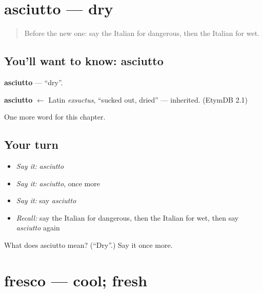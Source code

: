 \section[asciutto]{asciutto — dry}

\label{lesson:IT-C128-asciutto}



\begin{quote}
Before the new one: say the Italian for dangerous, then the Italian for wet.
\end{quote}

\subsection*{You'll want to know: asciutto}
\textbf{asciutto} — \textquotedblleft{}dry\textquotedblright{}.

\begin{cousinweb}
\textbf{asciutto} $\leftarrow$ Latin \emph{exsuctus}, \textquotedblleft{}sucked out, dried\textquotedblright{} — inherited. (EtymDB 2.1)
\end{cousinweb}

\begin{grammarlens}[title={What you've built}]
One more word for this chapter.
\end{grammarlens}

\subsection*{Your turn}
\begin{itemize}
\raggedright
  \item \emph{Say it:} \emph{asciutto}
  \item \emph{Say it:} \emph{asciutto}, once more
  \item \emph{Say it:} say \emph{asciutto}
  \item \emph{Recall:} say the Italian for dangerous, then the Italian for wet, then say \emph{asciutto} again
\end{itemize}

\begin{tcolorbox}[breakable,colback=teal!4,colframe=teal!35!black,title={Before you move on}]
What does asciutto mean? (\textquotedblleft{}Dry\textquotedblright{}.) Say it once more.
\end{tcolorbox}
\section[fresco]{fresco — cool; fresh}

